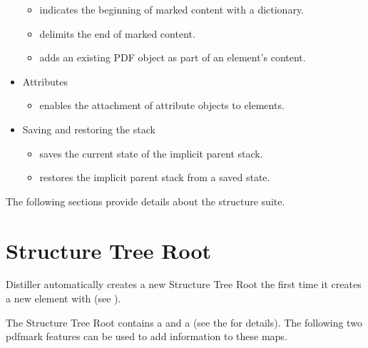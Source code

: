 \documentclass[letterpaper,12pt,english,openany,oneside]{sphinxmanual}
\begin{document}
\begin{itemize}
\begin{itemize}
\item {} 
 indicates the beginning of marked content with a dictionary.

\item {} 
 delimits the end of marked content.

\item {} 
 adds an existing PDF object as part of an element’s content.

\end{itemize}

\item {} 
Attributes
\begin{itemize}
\item {} 
 enables the attachment of attribute objects to elements.

\end{itemize}

\item {} 
Saving and restoring the stack
\begin{itemize}
\item {} 
 saves the current state of the implicit parent stack.

\item {} 
 restores the implicit parent stack from a saved state.

\end{itemize}

\end{itemize}

The following sections provide details about the structure suite.


\section{Structure Tree Root}
\label{\detokenize{pdfmark_Logical:structure-tree-root}}
Distiller automatically creates a new Structure Tree Root the first time it creates a new element with  (see ).

The Structure Tree Root contains a  and a  (see the  for details). The following two pdfmark features can be used to add information to these maps.
\end{document}
